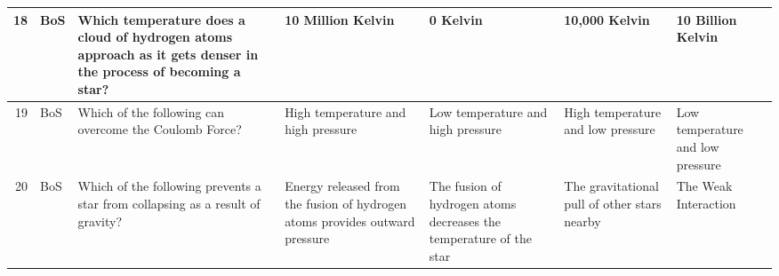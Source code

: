 \documentclass[10pt]{article}
\begin{document}
\begin{tiny}
\begin{longtable}{r|p{0.375in}|p{1.275in}|p{0.75in}|p{0.75in}|p{0.75in}|p{0.75in}}
    18    &     BoS &                                                                                                                                                                   Which temperature does a cloud of hydrogen atoms approach as it gets denser in the process of becoming a star? &                                                                                                                     10 Million Kelvin &                                                                                              0 Kelvin &                                                                                                              10,000 Kelvin &                                                                                                                 10 Billion Kelvin \\\hline
    19    &     BoS &                                                                                                                                                                                                                           Which of the following can overcome the Coulomb Force? &                                                                                                    High temperature and high pressure &                                                                     Low temperature and high pressure &                                                                                          High temperature and low pressure &                                                                                                  Low temperature and low pressure \\\hline
    20    &     BoS &                                                                                                                                                                                                   Which of the following prevents a star from collapsing as a result of gravity? &                                                           Energy released from the fusion of hydrogen atoms provides outward pressure &                                    The fusion of hydrogen atoms decreases the temperature of the star &                                                                               The gravitational pull of other stars nearby &                                                                                                              The Weak Interaction \\\hline

\end{longtable}
\end{tiny}
\end{document}
